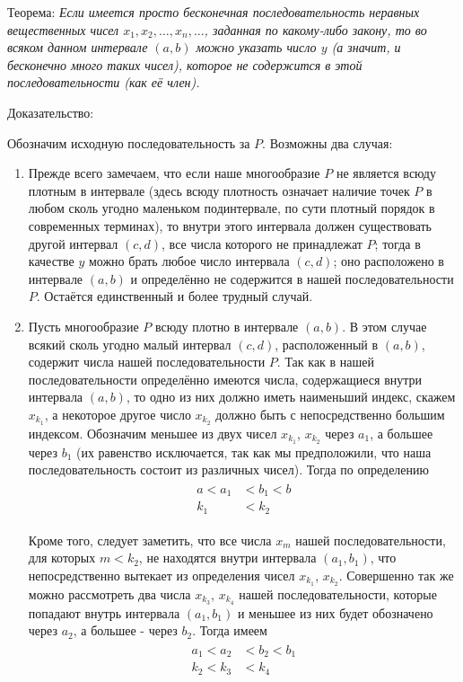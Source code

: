 \documentclass[12pt]{article}
\begin{document}
Теорема: {\sl Если имеется просто бесконечная последовательность неравных вещественных чисел $x_1, x_2, \dots, x_n, \dots$, заданная по какому-либо закону, то во всяком данном интервале $(a, b)$ можно указать число $y$ (а значит, и бесконечно много таких чисел), которое не содержится в этой последовательности (как её член).}

Доказательство: 

Обозначим исходную последовательность за $P$. Возможны два случая:

\begin{enumerate}
    \item Прежде всего замечаем, что если наше многообразие $P$ не является всюду плотным в интервале (здесь всюду плотность означает наличие точек $P$ в любом сколь угодно маленьком подинтервале, по сути плотный порядок в современных терминах), то внутри этого интервала должен существовать другой интервал $(c, d)$, все числа которого не принадлежат $P$; тогда в качестве $y$ можно брать любое число интервала $(c, d)$; оно расположено в интервале $(a, b)$ и определённо не содержится в нашей последовательности $P$. Остаётся единственный и более трудный случай.
    \item Пусть многообразие $P$ всюду плотно в интервале $(a, b)$. В этом случае всякий сколь угодно малый интервал $(c, d)$, расположенный в $(a, b)$, содержит числа нашей последовательности $P$. Так как в нашей последовательности определённо имеются числа, содержащиеся внутри интервала $(a, b)$, то одно из них должно иметь наименьший индекс, скажем $x_{k_1}$, а некоторое другое число $x_{k_2}$ должно быть с непосредственно большим индексом. Обозначим меньшее из двух чисел $x_{k_1}$, $x_{k_2}$ через $a_1$, а большее через $b_1$ (их равенство исключается, так как мы предположили, что наша последовательность состоит из различных чисел). Тогда по определению 
\begin{align}
\begin{split}
a < a_1 &< b_1 < b\\
k_1 &< k_2
\end{split}
\end{align}

Кроме того, следует заметить, что все числа $x_m$ нашей последовательности, для которых $m < k_2$, не находятся внутри интервала $(a_1, b_1)$, что непосредственно вытекает из определения чисел $x_{k_1}$, $x_{k_2}$. Совершенно так же можно рассмотреть два числа $x_{k_3}$, $x_{k_4}$ нашей последовательности, которые попадают внутрь интервала $(a_1, b_1)$ и меньшее из них будет обозначено через $a_2$, а большее - через $b_2$. Тогда имеем
\begin{align}
\begin{split}
a_1 < a_2 &< b_2 < b_1\\
k_2 < k_3 &< k_4
\end{split}
\end{align}


\end{enumerate}
\end{document}
